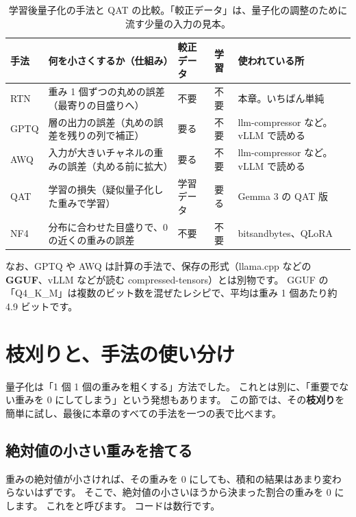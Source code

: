 \begin{table}[tbp]
\centering
\caption{学習後量子化の手法と QAT の比較。「較正データ」は、量子化の調整のために流す少量の入力の見本。}
\label{tab:quant-methods}
\small
\begin{tabular}{@{}>{\raggedright\arraybackslash}p{12mm}>{\raggedright\arraybackslash}p{38mm}>{\raggedright\arraybackslash}p{15mm}>{\raggedright\arraybackslash}p{9mm}>{\raggedright\arraybackslash}p{31mm}@{}}
\toprule
手法 & 何を小さくするか（仕組み） & 較正データ & 学習 & 使われている所 \\
\midrule
RTN & 重み 1 個ずつの丸めの誤差（最寄りの目盛りへ） & 不要 & 不要 & 本章。いちばん単純 \\
GPTQ & 層の出力の誤差（丸めの誤差を残りの列で補正） & 要る & 不要 & llm-compressor など。vLLM で読める \\
AWQ & 入力が大きいチャネルの重みの誤差（丸める前に拡大） & 要る & 不要 & llm-compressor など。vLLM で読める \\
QAT & 学習の損失（疑似量子化した重みで学習） & 学習データ & 要る & Gemma 3 の QAT 版 \\
NF4 & 分布に合わせた目盛りで、0 の近くの重みの誤差 & 不要 & 不要 & bitsandbytes、QLoRA \\
\bottomrule
\end{tabular}
\end{table}

なお、GPTQ や AWQ は計算の手法で、保存の形式（llama.cpp などの \textbf{GGUF}、vLLM などが読む compressed-tensors）とは別物です。
GGUF の「Q4\_K\_M」は複数のビット数を混ぜたレシピで、平均は重み 1 個あたり約 4.9 ビットです。


\section{枝刈りと、手法の使い分け}\label{sec:distill-prune}

量子化は「1 個 1 個の重みを粗くする」方法でした。
これとは別に、「重要でない重みを 0 にしてしまう」という発想もあります。
この節では、その\textbf{枝刈り}を簡単に試し、最後に本章のすべての手法を一つの表で比べます。

\subsection{絶対値の小さい重みを捨てる}\label{sec:distill-prune-mag}

重みの絶対値が小さければ、その重みを 0 にしても、積和の結果はあまり変わらないはずです。
そこで、絶対値の小さいほうから決まった割合の重みを 0 にします。
これをと呼びます\cite{han2015learning}。
コードは数行です。

